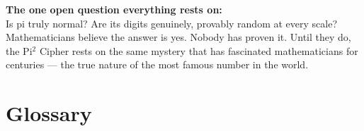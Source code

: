 \documentclass[12pt, a4paper]{article}
\begin{document}
\vspace{1.5em}

\begin{amberbox}
\textbf{The one open question everything rests on:}\\[0.4em]
\color{pigray}
Is pi truly normal? Are its digits genuinely, provably random at every scale? Mathematicians believe the answer is yes. Nobody has proven it. Until they do, the Pi$^2$ Cipher rests on the same mystery that has fascinated mathematicians for centuries --- the true nature of the most famous number in the world.
\end{amberbox}

\newpage
\section*{Glossary}
\end{document}
